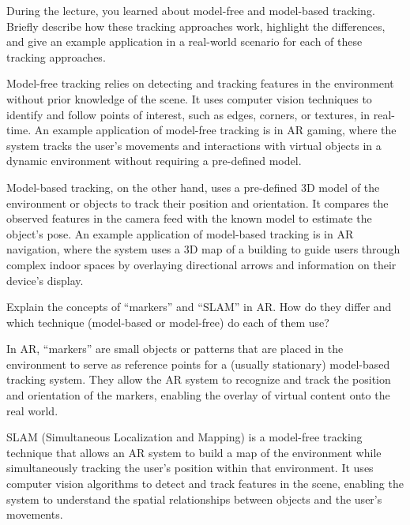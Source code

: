 \begin{ejercicio}
    During the lecture, you learned about model-free and model-based tracking. Briefly describe how these tracking approaches work, highlight the differences, and give an example application in a real-world scenario for each of these tracking approaches.

    Model-free tracking relies on detecting and tracking features in the environment without prior knowledge of the scene. It uses computer vision techniques to identify and follow points of interest, such as edges, corners, or textures, in real-time. An example application of model-free tracking is in AR gaming, where the system tracks the user's movements and interactions with virtual objects in a dynamic environment without requiring a pre-defined model.

    Model-based tracking, on the other hand, uses a pre-defined 3D model of the environment or objects to track their position and orientation. It compares the observed features in the camera feed with the known model to estimate the object's pose. An example application of model-based tracking is in AR navigation, where the system uses a 3D map of a building to guide users through complex indoor spaces by overlaying directional arrows and information on their device's display.
\end{ejercicio}

\begin{ejercicio}
    Explain the concepts of ``markers'' and ``SLAM'' in AR. How do they differ and which technique (model-based or model-free) do each of them use?

    In AR, ``markers'' are small objects or patterns that are placed in the environment to serve as reference points for a (usually stationary) model-based tracking system. They allow the AR system to recognize and track the position and orientation of the markers, enabling the overlay of virtual content onto the real world. 
    
    SLAM (Simultaneous Localization and Mapping) is a model-free tracking technique that allows an AR system to build a map of the environment while simultaneously tracking the user's position within that environment. It uses computer vision algorithms to detect and track features in the scene, enabling the system to understand the spatial relationships between objects and the user's movements.
\end{ejercicio}

